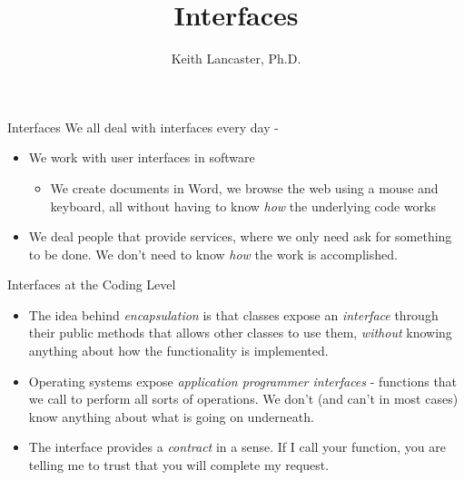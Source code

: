 \documentclass[10pt,xcolor={table,dvipsnames},t]{beamer}
\title[Your Short Title]{Interfaces}
\author{Keith Lancaster, Ph.D.}
\institute{Department of Computer Science and Engineering}
\date{}
\begin{document}
\begin{frame}
  \titlepage
\end{frame}


\section{}

\begin{frame}[c]{Interfaces}
\large
We all deal with interfaces every day - 
\begin{itemize}
	\item We work with user interfaces in software
	\large
	\begin{itemize}
	    \item We create documents in Word, we browse the web using a mouse and keyboard, all without having to know \textit{how} the underlying code works
    \end{itemize}   
    \item We deal people that provide services, where we only need ask for something to be done. We don't need to know \textit{how} the work is accomplished.

\end{itemize}
\end{frame}

\begin{frame}[c]{Interfaces at the Coding Level}
\large
\begin{itemize}

\item The idea behind \textit{encapsulation} is that classes expose an \textit{interface}
through their public methods that allows other classes to use them, \textit{without}
knowing anything about how the functionality is implemented.

\item Operating systems expose \textit{application programmer interfaces} - functions that we call to perform all sorts of operations. We don't (and can't in most cases) know anything about what is going on underneath. 

\item The interface provides a \textit{contract} in a sense. If I call your function, you are telling me to trust that you will complete my request.
\end{itemize}
\end{frame}
\end{document}
